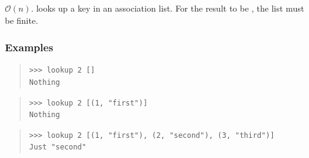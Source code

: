 \begin{haddockdesc}
\item[\begin{tabular}{@{}l}
lookup :: Eq a => a -> {\char 91}(a, b){\char 93} -> Maybe b
\end{tabular}]
{\haddockbegindoc
\(\mathcal{O}(n)\).   looks up a key in an association
 list.
 For the result to be , the list must be finite.\par
\subsubsection*{\textbf{Examples}}
\begin{quote}
{\haddockverb\begin{verbatim}
>>> lookup 2 []
Nothing

\end{verbatim}}
\end{quote}
\begin{quote}
{\haddockverb\begin{verbatim}
>>> lookup 2 [(1, "first")]
Nothing

\end{verbatim}}
\end{quote}
\begin{quote}
{\haddockverb\begin{verbatim}
>>> lookup 2 [(1, "first"), (2, "second"), (3, "third")]
Just "second"

\end{verbatim}}
\end{quote}}
\end{haddockdesc}
